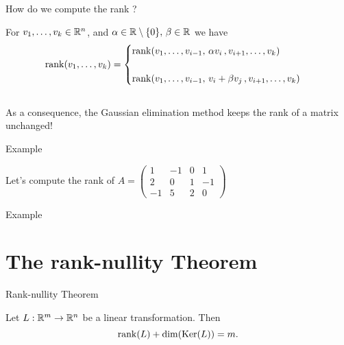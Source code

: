 \documentclass{beamer}
\begin{document}
\begin{frame}[t]{How do we compute the rank ?}
	\grid

	For $v_1, \dots, v_k \in \mathbb{R}^n$, and $\alpha \in \mathbb{R} \setminus \{0\}, \, \beta \in \mathbb{R}$ we have
	\begin{align*}
		{{\rm rank}}(v_1, \dots, v_k)
		=
		\begin{cases}
		{{\rm rank}}(v_1, \dots, v_{i-1}, \, \alpha v_i \, , v_{i+1}, \dots, v_k)\\
		\\
		{{\rm rank}}(v_1, \dots, v_{i-1}, \, v_i + \beta v_j \, , v_{i+1}, \dots, v_k)
		\end{cases}
	\end{align*}
	\vspace{2cm}
	\\
	As a consequence, the Gaussian elimination method keeps the rank of a matrix unchanged!
\end{frame}

\begin{frame}[t]{Example}
	\grid

	Let's compute the rank of \quad
	$\displaystyle
	A = 
	\begin{pmatrix}
		1  & -1 & 0 & 1 \\
		2  & 0 & 1 & -1 \\
		-1  & 5 & 2 & 0 
	\end{pmatrix}
	$
\end{frame}

\begin{frame}[t]{Example}
	\grid

\end{frame}

\section{The rank-nullity Theorem}
\begin{frame}[t]{Rank-nullity Theorem}
	\grid

	\vspace{-0.3cm}
	\begin{theorem}
		Let $L: \mathbb{R}^m \to \mathbb{R}^n$ be a linear transformation. Then
		$$
		{{\rm rank}}(L) + {{\rm dim}}({{\rm Ker}}(L)) = m.
		$$
	\end{theorem}

\end{frame}
\end{document}

